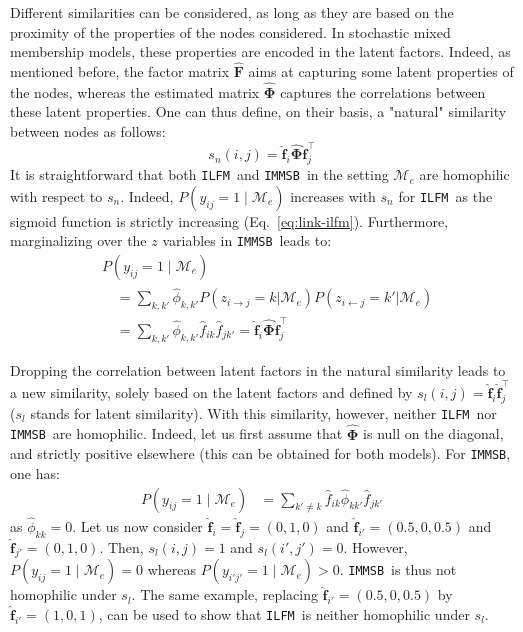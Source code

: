 \documentclass[conference]{IEEEtran}
\newcommand{\ifm}{\texttt{ILFM}}
\newcommand{\imb}{\texttt{IMMSB}}
\newcommand{\pr}{P}
\newcommand{\M}{\mathcal{M}}
\newcommand{\mat}[1]{\mathbf{#1}}
\begin{document}
Different similarities can be considered, as long as they are based on the proximity of the properties of the nodes considered. In stochastic mixed membership models, these properties are encoded in the latent factors. Indeed, as mentioned before, the factor matrix $\mat{\hat{F}}$ aims at capturing some latent properties of the nodes, whereas the estimated matrix $\mat{\hat{\Phi}}$ captures the correlations between these latent properties. One can thus define, on their basis, a "natural" similarity between nodes as follows:
%
\begin{equation}
s_n(i,j) = \mat{\hat{f}}_{i} \mat{\hat{\Phi}} \mat{\hat{f}}_j^\top \nonumber
\end{equation}
%
It is straightforward that both \ifm\ and \imb\ in the setting $\mathcal{M}_e$ are homophilic with respect to $s_n$. Indeed, $\pr(y_{ij}=1 \mid \mathcal{M}_e)$ increases with $s_n$ for \ifm\ as the sigmoid function is strictly increasing (Eq.~\ref{eq:link-ilfm}). Furthermore, marginalizing over the $z$ variables in \imb\ leads to:
%
\begin{align}
&\pr(y_{ij} =1 \mid \mathcal{M}_e) \nonumber \\
& \quad = \sum_{k,k'} \hat{\phi}_{k,k'} \pr(z_{i \rightarrow j}=k | \mathcal{M}_e) \pr(z_{i \leftarrow j}=k' | \mathcal{M}_e) \nonumber \\
& \quad= \sum_{k,k'} \hat{\phi}_{k,k'} \hat{f}_{ik} \hat{f}_{jk'} = \mat{\hat{f}}_{i} \mat{\hat{\Phi}} \mat{\hat{f}}_j^\top \nonumber
\end{align}

Dropping the correlation between latent factors in the natural similarity leads to a new similarity, solely based on the latent factors and defined by $s_l(i,j) = \mat{\hat{f}}_{i} \mat{\hat{f}}_j^\top \nonumber$ ($s_l$ stands for latent similarity). With this similarity, however, neither \ifm\  nor \imb\ are homophilic. Indeed, let us first assume that $\mat{\hat{\Phi}}$ is null on the diagonal, and strictly positive elsewhere (this can be obtained for both models). For \imb, one has:
%
\begin{align}
\pr(y_{ij}=1 \mid \M_e) & = \sum_{k' \neq k} \hat{f}_{ik} \hat{\phi}_{kk'} \hat{f}_{jk'} \nonumber 
\end{align}
%
as $\hat{\phi}_{kk} = 0$. Let us now consider $\mat{\hat{f}}_i=\mat{\hat{f}}_j=(0,1,0)$ and $\mat{\hat{f}}_{i'}=(0.5,0,0.5)$ and $\mat{\hat{f}}_{j'}=(0,1,0)$. Then, $s_l(i,j)=1$ and $s_l(i',j')=0$. However, $\pr(y_{ij}=1 \mid \M_e) = 0$ whereas $\pr(y_{i'j'}=1 \mid \M_e) > 0$. \imb\ is thus not homophilic under $s_l$. The same example, replacing $\mat{\hat{f}}_{i'}=(0.5,0,0.5)$ by $\mat{\hat{f}}_{i'}=(1,0,1)$, can be used to show that \ifm\ is neither homophilic under $s_l$.~\\
\end{document}
